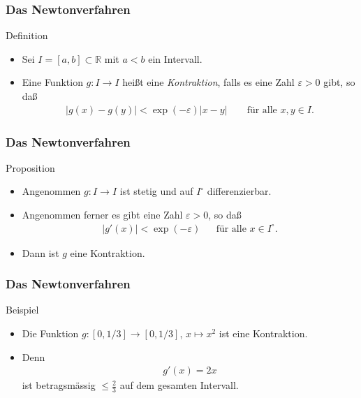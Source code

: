 \documentclass{beamer}
\renewcommand{\emph}[1]{{\textcolor{solarizedRed}{\itshape #1}}}
\newcommand\RR{\mathbb R}
\newcommand{\eps}{\varepsilon}
\newcommand{\abs}[1]{\left|#1\right|}
\renewcommand{\ae}{\"a}
\newcommand{\ue}{\"u}
\newcommand{\mytitle}{Das Newtonverfahren}
\begin{document}
\begin{frame}\frametitle{\mytitle}
	\begin{block}{Definition}
		\begin{itemize}
			\item Sei $I=[a,b]\subset\RR$ mit $a<b$ ein Intervall. 
			\item Eine Funktion $g:I\to I$ hei\ss t eine \emph{Kontraktion}, falls es eine Zahl $\eps>0$ gibt, so da\ss
				\begin{align*}
					\abs{g(x)-g(y)}<\exp(-\eps)|x-y|\qquad\mbox{f\ue r alle }x,y\in I.
				\end{align*}
		\end{itemize}
	\end{block}
\end{frame}

\begin{frame}\frametitle{\mytitle}
	\begin{block}{Proposition}
		\begin{itemize}
			\item Angenommen $g:I\to I$ ist stetig und auf $I^\circ$ differenzierbar.
			\item Angenommen ferner es gibt eine Zahl $\eps>0$, so da\ss
				\begin{align*}
					|g'(x)|<\exp(-\eps)&&\mbox{f\ue r alle }x\in I^\circ.
				\end{align*}
			\item Dann ist $g$ eine Kontraktion.
		\end{itemize}
	\end{block}
\end{frame}

\begin{frame}\frametitle{\mytitle}
	\begin{block}{Beispiel}
		\begin{itemize}
			\item Die Funktion $g:[0,1/3]\to[0,1/3]$, $x\mapsto x^2$ ist eine Kontraktion.
			\item Denn
				\begin{align*}
					g'(x)=2x
				\end{align*}
				ist betragsm\ae ssig $\leq\frac{2}{3}$ auf dem gesamten Intervall.
		\end{itemize}
	\end{block}
\end{frame}
\end{document}
